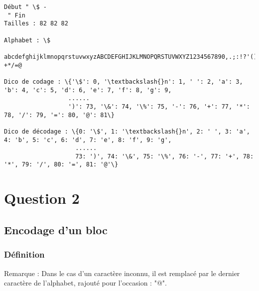 \documentclass{report}
\newenvironment{code}%
   {\snugshade}%
   {\endsnugshade}
\begin{document}
   \begin{code}\begin{Verbatim}[commandchars=\\\{\}]
Début " \$ - 
 " Fin
Tailles : 82 82 82

Alphabet : \$
 abcdefghijklmnopqrstuvwxyzABCDEFGHIJKLMNOPQRSTUVWXYZ1234567890,.;:!?'()\&\%-+*/=@

Dico de codage : \{'\$': 0, '\textbackslash{}n': 1, ' ': 2, 'a': 3, 'b': 4, 'c': 5, 'd': 6, 'e': 7, 'f': 8, 'g': 9,
                  ......
                  ')': 73, '\&': 74, '\%': 75, '-': 76, '+': 77, '*': 78, '/': 79, '=': 80, '@': 81\}
                  
Dico de décodage : \{0: '\$', 1: '\textbackslash{}n', 2: ' ', 3: 'a', 4: 'b', 5: 'c', 6: 'd', 7: 'e', 8: 'f', 9: 'g',
                    ......
                    73: ')', 74: '\&', 75: '\%', 76: '-', 77: '+', 78: '*', 79: '/', 80: '=', 81: '@'\}

    \end{Verbatim}
\end{code}

\section{\texorpdfstring{\textbf{Question
2}}{Question 2}}\label{question-2}

\subsection{\texorpdfstring{\textbf{Encodage d'un
bloc}}{Encodage d'un bloc}}\label{encodage-dun-bloc}

\subsubsection{\texorpdfstring{\textbf{Définition}}{Définition}}\label{duxe9finition}

Remarque : Dans le cas d'un caractère inconnu, il est remplacé par le
dernier caractère de l'alphabet, rajouté pour l'occasion : "@".
\end{document}
